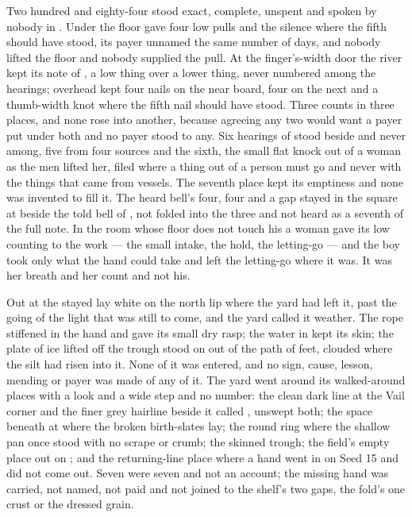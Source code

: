 Two hundred and eighty-four stood exact, complete, unspent and spoken by nobody in . Under the floor  gave four low pulls and the silence where the fifth should have stood, its payer unnamed the same number of days, and nobody lifted the floor and nobody supplied the pull. At the finger's-width door the river kept its note of , a low thing over a lower thing, never numbered among the hearings; overhead  kept four nails on the near board, four on the next and a thumb-width knot where the fifth nail should have stood. Three counts in three places, and none rose into another, because agreeing any two would want a payer put under both and no payer stood to any. Six hearings of  stood beside and never among, five from four sources and the sixth, the small flat knock out of a woman as the men lifted her, filed where a thing out of a person must go and never with the things that came from vessels. The seventh place kept its emptiness and none was invented to fill it. The heard bell's four, four and a gap stayed in the square at  beside the told bell of , not folded into the three and not heard as a seventh of the full note. In the room whose floor does not touch his a woman gave its low counting to the work --- the small intake, the hold, the letting-go --- and the boy took only what the hand could take and left the letting-go where it was. It was her breath and her count and not his.

Out at  the stayed  lay white on the north lip where the yard had left it, past the going of the light that was still to come, and the yard called it weather. The rope stiffened in the hand and gave its small dry rasp; the water in  kept its skin; the plate of ice lifted off the trough stood on  out of the path of feet, clouded where the silt had risen into it. None of it was entered, and no sign, cause, lesson, mending or payer was made of any of it. The yard went around its walked-around places with a look and a wide step and no number: the clean dark line at the Vail corner and the finer grey hairline beside it called , unswept both; the space beneath  at  where the broken birth-slates lay; the round ring where the shallow pan once stood with no scrape or crumb; the skinned trough; the field's empty place out on ; and the returning-line place where a hand went in on Seed 15 and did not come out. Seven were seven and not an account; the missing hand was carried, not named, not paid and not joined to the shelf's two gaps, the fold's one crust or the dressed grain.

